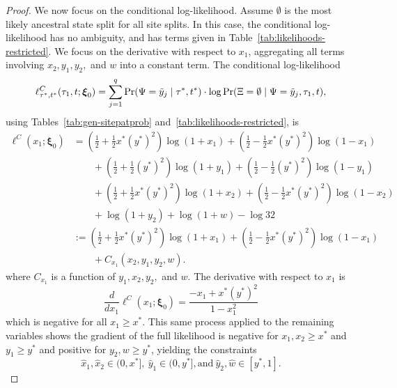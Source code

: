 \begin{proof}
We now focus on the conditional log-likelihood.
Assume $\emptyset$ is the most likely ancestral state split for all site splits.
In this case, the conditional log-likelihood has no ambiguity, and has terms given in Table~\ref{tab:likelihoods-restricted}.
We focus on the derivative with respect to $x_1$, aggregating all terms involving $x_2,y_1,y_2,$ and $w$ into a constant term.
The conditional log-likelihood
\[
\ell^C_{\tau^*,t^*}(\tau_1, t; \boldsymbol\xi_0) = \sum_{j=1}^q \Pr(\Psi=\tilde{y}_j \mid \tau^*, t^*)\cdot\log \Pr(\Xi=\emptyset \mid \Psi = \tilde{y}_j, \tau_1, t),
\]
using Tables~\ref{tab:gen-sitepatprob} and~\ref{tab:likelihoods-restricted}, is
\begin{align*}
\ell^C(x_1; \boldsymbol\xi_0) &= \left(\frac{1}{2}+\frac{1}{2}x^*(y^*)^2\right)\log(1+x_1) + \left(\frac{1}{2}-\frac{1}{2}x^*(y^*)^2\right)\log(1-x_1)\\
&\qquad + \left(\frac{1}{2}+\frac{1}{2}(y^*)^2\right)\log(1+y_1) + \left(\frac{1}{2}-\frac{1}{2}(y^*)^2\right)\log(1-y_1)\\
&\qquad + \left(\frac{1}{2}+\frac{1}{2}x^*(y^*)^2\right)\log(1+x_2) + \left(\frac{1}{2}-\frac{1}{2}x^*(y^*)^2\right)\log(1-x_2)\\
&\qquad + \log(1+y_2) + \log(1+w) - \log 32\\
&:= \left(\frac{1}{2}+\frac{1}{2}x^*(y^*)^2\right)\log(1+x_1) + \left(\frac{1}{2}-\frac{1}{2}x^*(y^*)^2\right)\log(1-x_1)\\
&\qquad + C_{x_1}(x_2,y_1,y_2,w).
\end{align*}
where $C_{x_1}$ is a function of $y_1,x_2,y_2,$ and $w$.
The derivative with respect to $x_1$ is
\[
\frac{d}{dx_1} \ell^C(x_1; \boldsymbol\xi_0) = \frac{-x_1+x^*(y^*)^2}{1-x_1^2}
\]
which is negative for all $x_1 \ge x^*$.
This same process applied to the remaining variables shows the gradient of the full likelihood is negative for $x_1,x_2 \ge x^*$ and $y_1 \ge y^*$ and positive for $y_2,w \ge y^*$, yielding the constraints
\[
\hat{x}_1,\hat{x}_2 \in (0, x^*], \ \hat{y}_1 \in (0, y^*], \text{and}\ \hat{y}_2,\hat{w} \in [y^*, 1].
\]
\end{proof}

